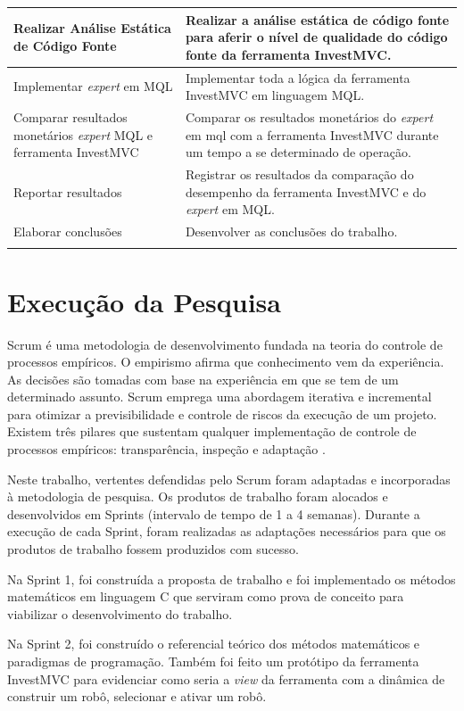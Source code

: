 \begin{center}
\begin{longtable}{| p{8cm} | p{8cm} |}
	Realizar Análise Estática de Código Fonte & Realizar a análise estática de código fonte para aferir o nível de qualidade do código fonte da ferramenta InvestMVC.\\ \hline
	Implementar \textit{expert} em MQL & Implementar toda a lógica da ferramenta InvestMVC em linguagem MQL.\\ \hline
	Comparar resultados monetários \textit{expert} MQL e ferramenta InvestMVC & Comparar os resultados monetários do \textit{expert} em mql com a ferramenta InvestMVC durante um tempo a se determinado de operação.\\ \hline
	Reportar resultados & Registrar os resultados da comparação do desempenho da ferramenta InvestMVC e do \textit{expert} em MQL.\\ \hline
	Elaborar conclusões & Desenvolver as conclusões do trabalho.\\
\label{atividadeMetologia}
\end{longtable}
\end{center}

\section{Execução da Pesquisa}

Scrum é uma metodologia de desenvolvimento fundada na teoria do controle de processos empíricos. O empirismo afirma que conhecimento vem da experiência. As decisões são tomadas com base na experiência em que se tem de um determinado assunto. Scrum emprega uma abordagem iterativa e incremental para otimizar a previsibilidade e controle de riscos da execução de um projeto. Existem três pilares que sustentam qualquer implementação de controle de processos empíricos: transparência, inspeção e adaptação \cite[pág.~4]{schwaber2013}.

Neste trabalho, vertentes defendidas pelo Scrum foram adaptadas e incorporadas à metodologia de pesquisa. Os produtos de  trabalho foram alocados e desenvolvidos em Sprints (intervalo de tempo de 1 a 4 semanas). Durante a execução de cada Sprint, foram realizadas as adaptações necessários para que os produtos de trabalho fossem produzidos com sucesso.

Na Sprint 1, foi construída a proposta de trabalho e foi implementado os métodos matemáticos em linguagem C que serviram como prova de conceito para viabilizar o desenvolvimento do trabalho.

Na Sprint 2, foi construído o referencial teórico dos métodos matemáticos e paradigmas de programação. Também foi feito um protótipo da ferramenta InvestMVC para evidenciar como seria a \textit{view} da ferramenta com a dinâmica de construir um robô, selecionar e ativar um robô.


